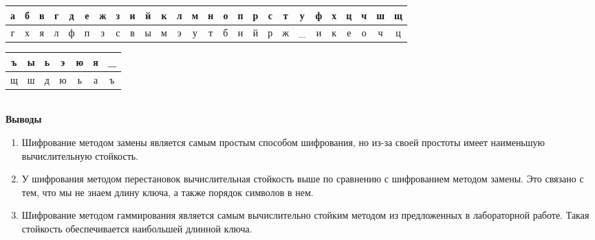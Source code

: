 \documentclass[a4paper,14pt]{extarticle}
\begin{document}
    \begin{center}
        \begin{tabular}{|c|c|c|c|c|c|c|c|c|c|c|c|c|c|c|c|c|c|c|c|c|c|c|c|c|c|}
            \hline
            а & б & в & г & д & е & ж & з & и & й & к & л & м & н & о & п & р & с & т & у & ф & х & ц & ч & ш & щ \\
            \hline
            г & х & я & л & ф & п & з & с & в & ы & м & э & у & т & б & н & й & р & ж &\_ & и & к & е & о & ч & ц \\
            \hline
        \end{tabular}

    \end{center}
    \begin{tabular}{|c|c|c|c|c|c|c|}
        \hline
        ъ & ы & ь & э & ю & я & \_ \\
        \hline
        щ & ш & д & ю & ь & а & ъ \\
        \hline
    \end{tabular}\\



    \textbf{Выводы}
    \begin{enumerate}
        \item Шифрование методом замены является самым простым способом шифрования,
        но из-за своей простоты имеет наименьшую вычислительную стойкость.
        \item У шифрования методом перестановок вычислительная стойкость выше по сравнению
        с шифрованием методом замены. Это связано с тем, что мы не знаем длину ключа, а также
        порядок символов в нем.
        \item Шифрование методом гаммирования является самым вычислительно стойким методом из
        предложенных в лабораторной работе. Такая стойкость обеспечивается наибольшей длинной ключа.
    \end{enumerate}
\end{document}
